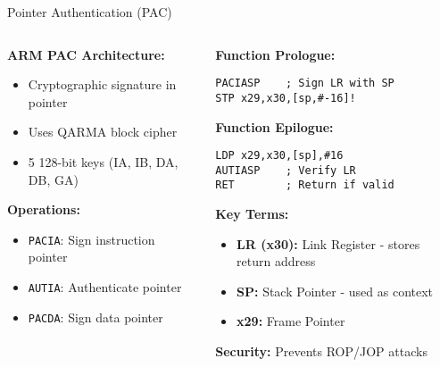 \documentclass[aspectratio=169,12pt]{beamer}
\begin{document}
\begin{frame}[fragile]{Pointer Authentication (PAC)}
    \begin{columns}
        \begin{column}{0.5\textwidth}
            \textbf{ARM PAC Architecture:}
            \begin{itemize}
                \item Cryptographic signature in pointer
                \item Uses QARMA block cipher
                \item 5 128-bit keys (IA, IB, DA, DB, GA)
            \end{itemize}
            
            \vspace{0.3cm}
            \textbf{Operations:}
            \begin{itemize}
                \item \texttt{PACIA}: Sign instruction pointer
                \item \texttt{AUTIA}: Authenticate pointer
                \item \texttt{PACDA}: Sign data pointer
            \end{itemize}
        \end{column}
        \begin{column}{0.5\textwidth}
            \begin{tcolorbox}[colback=gray!10]
                \small
                \textbf{Function Prologue:}
                \begin{verbatim}
PACIASP    ; Sign LR with SP
STP x29,x30,[sp,#-16]!
                \end{verbatim}
                
                \textbf{Function Epilogue:}
                \begin{verbatim}
LDP x29,x30,[sp],#16
AUTIASP    ; Verify LR
RET        ; Return if valid
                \end{verbatim}
            \end{tcolorbox}
            
            \vspace{0.2cm}
            \textbf{Key Terms:}
            \begin{itemize}
                \item \textbf{LR (x30):} Link Register - stores return address
                \item \textbf{SP:} Stack Pointer - used as context
                \item \textbf{x29:} Frame Pointer
            \end{itemize}
            
            \textbf{Security:} Prevents ROP/JOP attacks
        \end{column}
    \end{columns}
\end{frame}
\end{document}
